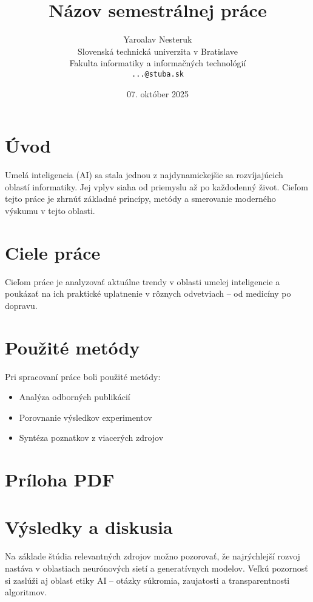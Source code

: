 \documentclass{article}  %
\title{Názov semestrálnej práce}
\author{Yaroalav Nesteruk \\ 
        {\small Slovenská technická univerzita v Bratislave} \\
        {\small Fakulta informatiky a informačných technológií} \\
        {\small \texttt{...@stuba.sk}}}
\date{07. október 2025}
\begin{document}
\maketitle

\section{Úvod}
Umelá inteligencia (AI) sa stala jednou z najdynamickejšie sa rozvíjajúcich oblastí informatiky. 
Jej vplyv siaha od priemyslu až po každodenný život. Cieľom tejto práce je zhrnúť základné princípy, 
metódy a smerovanie moderného výskumu v tejto oblasti.

\section{Ciele práce}
Cieľom práce je analyzovať aktuálne trendy v oblasti umelej inteligencie a poukázať na ich praktické 
uplatnenie v rôznych odvetviach – od medicíny po dopravu.

\section{Použité metódy}
Pri spracovaní práce boli použité metódy:
\begin{itemize}
    \item Analýza odborných publikácií
    \item Porovnanie výsledkov experimentov
    \item Syntéza poznatkov z viacerých zdrojov
\end{itemize}

\section{Príloha PDF}

\section{Výsledky a diskusia}
Na základe štúdia relevantných zdrojov možno pozorovať, že najrýchlejší rozvoj nastáva v oblastiach 
neurónových sietí a generatívnych modelov. Veľkú pozornosť si zaslúži aj oblasť etiky AI – otázky súkromia, 
zaujatosti a transparentnosti algoritmov.

\end{document}
